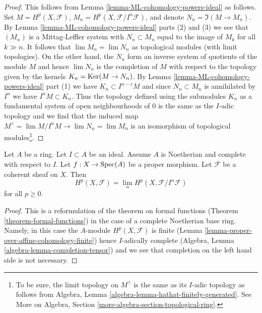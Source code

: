 \begin{proof}
This follows from Lemma \ref{lemma-ML-cohomology-powers-ideal} as follows.
Set $M = H^p(X, \mathcal{F})$, $M_n = H^p(X, \mathcal{F}/I^n\mathcal{F})$,
and denote $N_n = \Im(M \to M_n)$. By
Lemma \ref{lemma-ML-cohomology-powers-ideal} parts (2) and (3) we see that
$(M_n)$ is a Mittag-Leffler system with
$N_n \subset M_n$ equal to the image of $M_k$ for all $k \gg n$.
It follows that $\lim M_n = \lim N_n$ as topological modules (with limit
topologies). On the other hand, the $N_n$ form an inverse system of quotients
of the module $M$ and hence $\lim N_n$ is the completion of $M$
with respect to the topology given by the kernels $K_n = \mathop{\mathrm{Ker}}(M \to N_n)$.
By Lemma \ref{lemma-ML-cohomology-powers-ideal} part (1)
we have $K_n \subset I^{n - c}M$ and since $N_n \subset M_n$
is annihilated by $I^n$ we have $I^n M \subset K_n$.
Thus the topology defined using the submodules $K_n$
as a fundamental system of open neighbourhoods of $0$
is the same as the $I$-adic topology and we find that the
induced map $M^\wedge = \lim M/I^nM \to \lim N_n = \lim M_n$
is an isomorphism of topological modules\footnote{
To be sure, the limit topology on $M^\wedge$ is the same as its
$I$-adic topology as follows from
Algebra, Lemma \ref{algebra-lemma-hathat-finitely-generated}.
See More on Algebra, Section \ref{more-algebra-section-topological-ring}.}.
\end{proof}

\begin{lemma}
\label{lemma-spell-out-theorem-formal-functions}
Let $A$ be a ring. Let $I \subset A$ be an ideal. Assume $A$ is
Noetherian and complete with respect to $I$.
Let $f : X \to \mathop{\mathrm{Spec}}(A)$ be a proper morphism.
Let $\mathcal{F}$ be a coherent sheaf on $X$.
Then
$$
H^p(X, \mathcal{F}) = \lim_n H^p(X, \mathcal{F}/I^n\mathcal{F})
$$
for all $p \geq 0$.
\end{lemma}

\begin{proof}
This is a reformulation of the theorem on formal functions
(Theorem \ref{theorem-formal-functions}) in the
case of a complete Noetherian base ring. Namely, in this case the
$A$-module $H^p(X, \mathcal{F})$ is finite
(Lemma \ref{lemma-proper-over-affine-cohomology-finite}) hence
$I$-adically complete (Algebra, Lemma \ref{algebra-lemma-completion-tensor})
and we see that completion on the left hand side is not necessary.
\end{proof}

